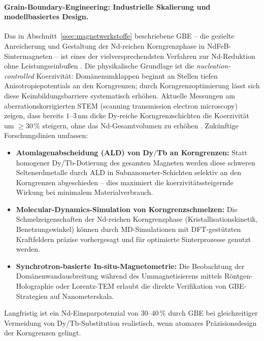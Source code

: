 ﻿\documentclass[12pt, a4paper]{report}
\theoremstyle{definition}
\theoremstyle{remark}
\begin{document}
\paragraph{Grain-Boundary-Engineering: Industrielle Skalierung und
modellbasiertes Design.}
Das in Abschnitt~\ref{ssec:magnetwerkstoffe} beschriebene GBE -- die gezielte
Anreicherung und Gestaltung der Nd-reichen Korngrenzphase in NdFeB-Sintermagneten
-- ist eines der vielversprechendsten Verfahren zur Nd-Reduktion ohne
Leistungseinbußen \cite{hono2012}. Die physikalische Grundlage ist die
\emph{nucleation-controlled} Koerzivität: Domänenumklappen beginnt an Stellen
tiefen Anisotropiepotentials an den Korngrenzen; durch Korngrenzoptimierung lässt
sich diese Keimbildungsbarriere systematisch erhöhen. Aktuelle Messungen am
aberrationskorrigierten STEM (scanning transmission electron microscopy) zeigen,
dass bereits $1$--$3\,\text{nm}$ dicke Dy-reiche Korngrenzschichten die
Koerzivität um $\geq 30\,\%$ steigern, ohne das Nd-Gesamtvolumen zu erhöhen
\cite{sepehriamin2012}. Zukünftige Forschungslinien umfassen:
\begin{itemize}
  \item \textbf{Atomlagenabscheidung (ALD) von Dy$/$Tb an Korngrenzen:} Statt
        homogener Dy/Tb-Dotierung des gesamten Magneten werden diese schweren
        Seltenerdmetalle durch ALD in Subnanometer-Schichten selektiv an den
        Korngrenzen abgeschieden -- dies maximiert die koerzivitätssteigernde
        Wirkung bei minimalem Materialverbrauch.
  \item \textbf{Molecular-Dynamics-Simulation von Korngrenzschmelzen:}
        Die Schmelzeigenschaften der Nd-reichen Korngrenzphase (Kristallisations\-kinetik,
        Benetzungswinkel) können durch MD-Simulationen mit DFT-gestützten
        Kraftfeldern präzise vorhergesagt und für optimierte Sinterprozesse
        genutzt werden.
  \item \textbf{Synchrotron-basierte In-situ-Magnetometrie:} Die Beobachtung
        der Domänenwandausbreitung während des Ummagnetisierens mittels
        Röntgen-Holographie oder Lorentz-TEM erlaubt die direkte Verifikation
        von GBE-Strategien auf Nanometerskala.
\end{itemize}
Langfristig ist ein Nd-Einsparpotenzial von $30$--$40\,\%$ durch GBE bei
gleichzeitiger Vermeidung von Dy/Tb-Substitution realistisch,
wenn atomares Präzisionsdesign der Korngrenzen gelingt.
\end{document}
